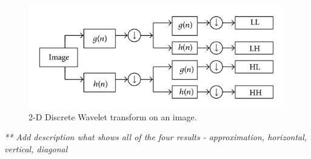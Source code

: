 \begin{figure}[h]
	\centering
	\includegraphics[width=\textwidth]{2D_DWT.JPG}
	\caption{2-D Discrete Wavelet transform on an image.}
	\label{fig:2D_DWT}
\end{figure}


\textit{** Add description what shows all of the four results - approximation, horizontal, vertical, diagonal}


